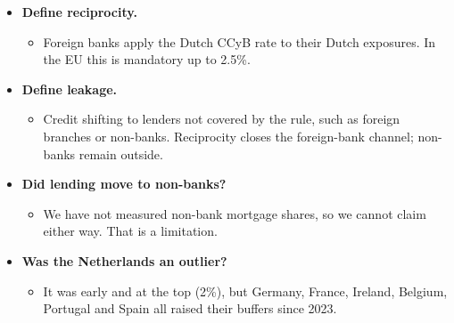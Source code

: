 \documentclass[10pt]{article}
\begin{document}
\begin{tcolorbox}[sbox,width=0.495\linewidth,height=14.6cm,nobeforeafter,box align=top,fit basedim=11pt,colframe=nlred!70,colbacktitle=nlred!8,coltitle=nlred,title=LIKELY CHALLENGES · definitions and logic]
\begin{itemize}
\item[\textcolor{navy}{\textbf{Q}}] \textbf{Define reciprocity.}
\begin{itemize}
\item Foreign banks apply the Dutch CCyB rate to their Dutch exposures. In the EU this is mandatory up to 2.5\%.
\end{itemize}
\item[\textcolor{navy}{\textbf{Q}}] \textbf{Define leakage.}
\begin{itemize}
\item Credit shifting to lenders not covered by the rule, such as foreign branches or non-banks. Reciprocity closes the foreign-bank channel; non-banks remain outside.
\end{itemize}
\item[\textcolor{navy}{\textbf{Q}}] \textbf{Did lending move to non-banks?}
\begin{itemize}
\item We have not measured non-bank mortgage shares, so we cannot claim either way. That is a limitation.
\end{itemize}
\item[\textcolor{navy}{\textbf{Q}}] \textbf{Was the Netherlands an outlier?}
\begin{itemize}
\item It was early and at the top (2\%), but Germany, France, Ireland, Belgium, Portugal and Spain all raised their buffers since 2023.
\end{itemize}
\end{itemize}
\end{tcolorbox}
\newpage
\end{document}
